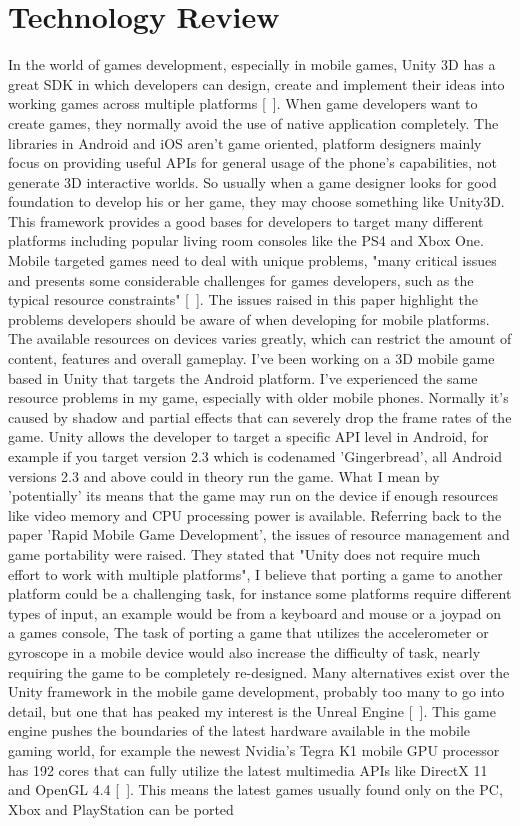 \chapter{Technology Review}
In the world of games development, especially in mobile games, Unity 3D has a great SDK in which developers can design, create and implement their ideas into working games across multiple platforms [~\cite{Unity3D}]. When game developers want to create games, they normally avoid the use of native application completely. The libraries in Android and iOS aren't game oriented, platform designers mainly focus on providing useful APIs for general usage of the phone's capabilities, not generate 3D interactive worlds. So usually when a game designer looks for good foundation to develop his or her game, they may choose something like Unity3D. This framework provides a good bases for developers to target many different platforms including popular living room consoles like the PS4 and Xbox One. Mobile targeted games need to deal with unique problems, "many critical issues and presents some considerable challenges for games developers, such as the typical resource constraints" [~\cite{RAD-Game-Development}]. The issues raised in this paper highlight the problems developers should be aware of when developing for mobile platforms. The available resources on devices varies greatly, which can restrict the amount of content, features and overall gameplay. I've been working on a 3D mobile game based in Unity that targets the Android platform. I've experienced the same resource problems in my game, especially with older mobile phones. Normally it’s caused by shadow and partial effects that can severely drop the frame rates of the game. Unity allows the developer to target a specific API level in Android, for example if you target version 2.3 which is codenamed 'Gingerbread', all Android versions 2.3 and above could in theory run the game. What I mean by 'potentially' its means that the game may run on the device if enough resources like video memory and CPU processing power is available. Referring back to the paper 'Rapid Mobile Game Development', the issues of resource management and game portability were raised. They stated that "Unity does not require much effort to work with multiple platforms", I believe that porting a game to another platform could be a challenging task, for instance some platforms require different types of input, an example would be from a keyboard and mouse or a joypad on a games console, The task of porting a game that utilizes the accelerometer or gyroscope in a mobile device would also increase the difficulty of task, nearly requiring the game to be completely re-designed. Many alternatives exist over the Unity framework in the mobile game development, probably too many to go into detail, but one that has peaked my interest is the Unreal Engine [~\cite{Unreal-Engine}]. This game engine pushes the boundaries of the latest hardware available in the mobile gaming world, for example the newest Nvidia’s Tegra K1 mobile GPU processor has 192 cores that can fully utilize the latest multimedia APIs like DirectX 11 and OpenGL 4.4 [~\cite{Nvidia-K1}]. This means the latest games usually found only on the PC, Xbox and PlayStation can be ported 